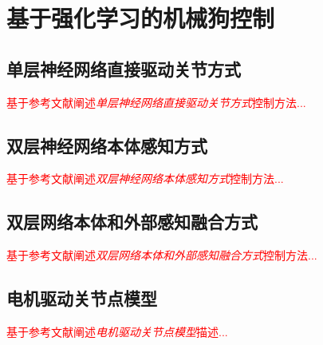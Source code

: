 
\chapter{基于强化学习的机械狗控制}

\section[单层神经网络直接驱动关节方式]{\label{section:direct_network}单层神经网络直接驱动关节方式\cite[p3]{Hwangbo_Lee_Dosovitskiy_Bellicoso_Tsounis_Koltun_Hutter_2019}}

\textcolor{red}{\small
基于参考文献阐述\emph{单层神经网络直接驱动关节方式}控制方法...
}

\section[双层神经网络本体感知方式]{双层神经网络本体感知方式\cite[p8]{Lee_Hwangbo_Wellhausen_Koltun_Hutter_2020}}

\textcolor{red}{\small
基于参考文献阐述\emph{双层神经网络本体感知方式}控制方法...
}

\section[双层网络本体和外部感知融合方式]{双层网络本体和外部感知融合方式\cite[p7]{Miki_Lee_Hwangbo_Wellhausen_Koltun_Hutter_2022}}

\textcolor{red}{\small
基于参考文献阐述\emph{双层网络本体和外部感知融合方式}控制方法...
}

\section[电机驱动关节点模型]{电机驱动关节点模型\cite[p4]{Gehring_Coros_Hutter_Bellicoso_Heijnen_Diethelm_Bloesch_Fankhauser_Hwangbo_Hoepflinger_et_al_2016}}

\textcolor{red}{\small
基于参考文献阐述\emph{电机驱动关节点模型}描述...
}
